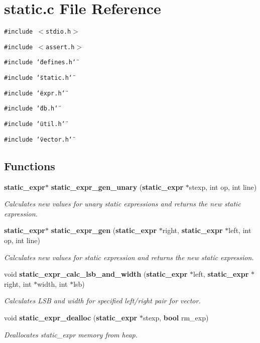 \section{static.c File Reference}
\label{static_8c}
{\tt \#include $<$stdio.h$>$}\par
{\tt \#include $<$assert.h$>$}\par
{\tt \#include \char`\"{}defines.h\char`\"{}}\par
{\tt \#include \char`\"{}static.h\char`\"{}}\par
{\tt \#include \char`\"{}expr.h\char`\"{}}\par
{\tt \#include \char`\"{}db.h\char`\"{}}\par
{\tt \#include \char`\"{}util.h\char`\"{}}\par
{\tt \#include \char`\"{}vector.h\char`\"{}}\par
\subsection*{Functions}
\begin{CompactItemize}
\item 
{\bf static\_\-expr}$\ast$ {\bf static\_\-expr\_\-gen\_\-unary} ({\bf static\_\-expr} $\ast$stexp, int op, int line)
\begin{CompactList}\small\item\em Calculates new values for unary static expressions and returns the new static expression.\item\end{CompactList}\item 
{\bf static\_\-expr}$\ast$ {\bf static\_\-expr\_\-gen} ({\bf static\_\-expr} $\ast$right, {\bf static\_\-expr} $\ast$left, int op, int line)
\begin{CompactList}\small\item\em Calculates new values for static expression and returns the new static expression.\item\end{CompactList}\item 
void {\bf static\_\-expr\_\-calc\_\-lsb\_\-and\_\-width} ({\bf static\_\-expr} $\ast$left, {\bf static\_\-expr} $\ast$right, int $\ast$width, int $\ast$lsb)
\begin{CompactList}\small\item\em Calculates LSB and width for specified left/right pair for vector.\item\end{CompactList}\item 
void {\bf static\_\-expr\_\-dealloc} ({\bf static\_\-expr} $\ast$stexp, {\bf bool} rm\_\-exp)
\begin{CompactList}\small\item\em Deallocates static\_\-expr memory from heap.\item\end{CompactList}\end{CompactItemize}


